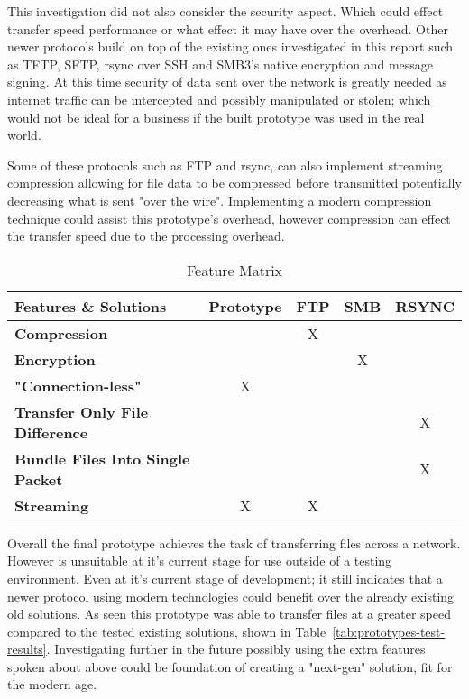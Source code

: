 This investigation did not also consider the security aspect. Which could effect transfer speed performance or what effect it may have over the overhead. Other newer protocols build on top of the existing ones investigated in this report such as TFTP, SFTP, rsync over SSH and SMB3's native encryption and message signing. At this time security of data sent over the network is greatly needed as internet traffic can be intercepted and possibly manipulated or stolen; which would not be ideal for a business if the built prototype was used in the real world.

Some of these protocols such as FTP and rsync, can also implement streaming compression allowing for file data to be compressed before transmitted potentially decreasing what is sent "over the wire". Implementing a modern compression technique could assist this prototype's overhead, however compression can effect the transfer speed due to the processing overhead.

\begin{table}[h!]
	\caption{Feature Matrix}
	\label{tab:feature-matrix}
	\centering
	\begin{tabular}{| l || c | c | c | c |}
		\hline
		Features \& Solutions                    & \textbf{Prototype} & \textbf{FTP} & \textbf{SMB} & \textbf{RSYNC} \\
		\hline
		\hline
		\textbf{Compression}                     &                    & X            &              &                \\
		\hline
		\textbf{Encryption}                      &                    &              & X            &                \\
		\hline
		\textbf{"Connection-less"}               & X                  &              &              &                \\
		\hline
		\textbf{Transfer Only File Difference}   &                    &              &              & X              \\
		\hline
		\textbf{Bundle Files Into Single Packet} &                    &              &              & X              \\
		\hline
		\textbf{Streaming}                       & X                  & X            &              &                \\
		\hline
	\end{tabular}
\end{table}

Overall the final prototype achieves the task of transferring files across a network. However is unsuitable at it's current stage for use outside of a testing environment. Even at it's current stage of development; it still indicates that a newer protocol using modern technologies could benefit over the already existing old solutions. As seen this prototype was able to transfer files at a greater speed compared to the tested existing solutions, shown in Table~\ref{tab:prototypes-test-results}. Investigating further in the future possibly using the extra features spoken about above could be foundation of creating a "next-gen" solution, fit for the modern age.
